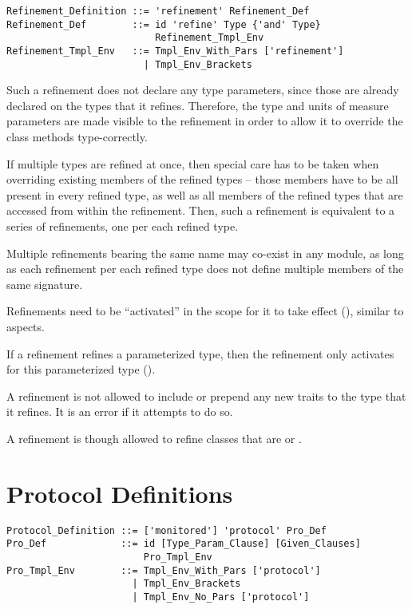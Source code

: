 \grammar\begin{lstlisting}
Refinement_Definition ::= 'refinement' Refinement_Def
Refinement_Def        ::= id 'refine' Type {'and' Type} 
                          Refinement_Tmpl_Env
Refinement_Tmpl_Env   ::= Tmpl_Env_With_Pars ['refinement']
                        | Tmpl_Env_Brackets
\end{lstlisting}

Such a refinement does not declare any type parameters, since those are already declared on the types that it refines. Therefore, the type and units of measure parameters are made visible to the refinement in order to allow it to override the class methods type-correctly. 

If multiple types are refined at once, then special care has to be taken when overriding existing members of the refined types -- those members have to be all present in every refined type, as well as all members of the refined types that are accessed from within the refinement. Then, such a refinement is equivalent to a series of refinements, one per each refined type. 

Multiple refinements bearing the same name may co-exist in any module, as long as each refinement per each refined type does not define multiple members of the same signature. 

Refinements need to be ``activated'' in the scope for it to take effect (), similar to aspects.

If a refinement refines a parameterized type, then the refinement only activates for this parameterized type (). 

A refinement is not allowed to include or prepend any new traits to the type that it refines. It is an error if it attempts to do so. 

A refinement is though allowed to refine classes that are  or . 






\section{Protocol Definitions}
\label{sec:protocols}

\grammar\begin{lstlisting}
Protocol_Definition ::= ['monitored'] 'protocol' Pro_Def
Pro_Def             ::= id [Type_Param_Clause] [Given_Clauses]
                        Pro_Tmpl_Env
Pro_Tmpl_Env        ::= Tmpl_Env_With_Pars ['protocol']
                      | Tmpl_Env_Brackets
                      | Tmpl_Env_No_Pars ['protocol']
\end{lstlisting}

